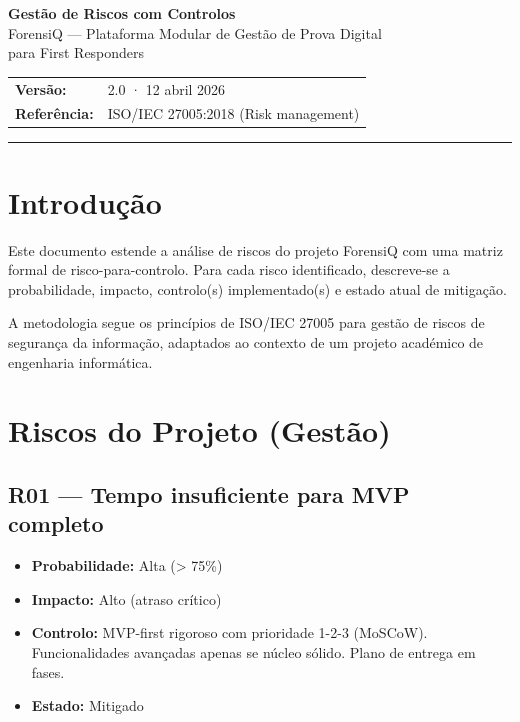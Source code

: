 \documentclass[a4paper,11pt]{article}
\begin{document}

\begin{center}
    {\LARGE\bfseries Gestão de Riscos com Controlos}\\[0.8em]
    {\large ForensiQ --- Plataforma Modular de Gestão de Prova Digital\\
    para First Responders}\\[1.2em]
    \begin{tabular}{ll}
        \textbf{Versão:} & 2.0 · 12 abril 2026 \\
        \textbf{Referência:} & ISO/IEC 27005:2018 (Risk management) \\
    \end{tabular}
\end{center}

\vspace{0.5em}
\hrule
\vspace{1.5em}

\section{Introdução}

Este documento estende a análise de riscos do projeto ForensiQ com uma matriz
formal de risco-para-controlo. Para cada risco identificado, descreve-se a
probabilidade, impacto, controlo(s) implementado(s) e estado atual de mitigação.

A metodologia segue os princípios de ISO/IEC 27005 para gestão de riscos de
segurança da informação, adaptados ao contexto de um projeto académico de
engenharia informática.

\section{Riscos do Projeto (Gestão)}

\subsection*{R01 — Tempo insuficiente para MVP completo}

\begin{itemize}[nosep]
    \item \textbf{Probabilidade:} Alta (> 75\%)
    \item \textbf{Impacto:} Alto (atraso crítico)
    \item \textbf{Controlo:} MVP-first rigoroso com prioridade 1-2-3 (MoSCoW).
          Funcionalidades avançadas apenas se núcleo sólido. Plano de entrega em fases.
    \item \textbf{Estado:} Mitigado
\end{itemize}
\end{document}

